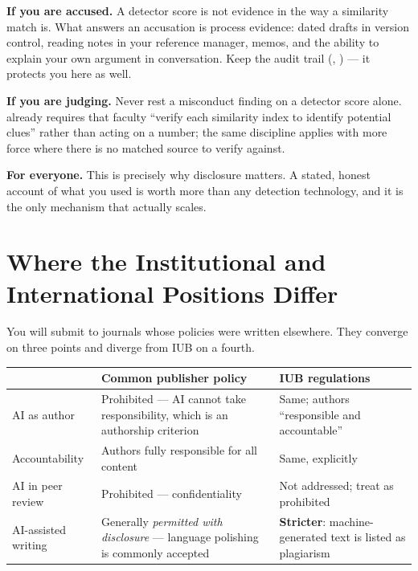 \begin{conceptbox}
\textbf{If you are accused.} A detector score is not evidence in the way a
similarity match is. What answers an accusation is process evidence: dated
drafts in version control, reading notes in your reference manager, memos,
and the ability to explain your own argument in conversation. Keep the audit
trail (, ) --- it protects you here as well.

\medskip
\textbf{If you are judging.} Never rest a misconduct finding on a detector
score alone.  already requires that faculty
``verify each similarity index to identify potential clues'' rather than acting
on a number; the same discipline applies with more force where there is no
matched source to verify against.

\medskip
\textbf{For everyone.} This is precisely why disclosure matters. A stated,
honest account of what you used is worth more than any detection technology,
and it is the only mechanism that actually scales.
\end{conceptbox}

\section{Where the Institutional and International Positions Differ}

You will submit to journals whose policies were written elsewhere. They
converge on three points and diverge from IUB on a fourth.

\begin{center}
\small
\begin{tabular}{@{}L{4.4cm}L{4.6cm}L{4.7cm}@{}}
\toprule
 & \textbf{Common publisher policy} & \textbf{IUB regulations} \\
\midrule
AI as author
  & Prohibited --- AI cannot take responsibility, which is an authorship
    criterion~\cite{icmje2024recommendations}
  & Same; authors ``responsible and accountable'' \\
Accountability
  & Authors fully responsible for all content
  & Same, explicitly \\
AI in peer review
  & Prohibited --- confidentiality
  & Not addressed; treat as prohibited \\
AI-assisted writing
  & Generally \emph{permitted with disclosure} --- language polishing is
    commonly accepted
  & \textbf{Stricter}: machine-generated text is listed as plagiarism \\
\bottomrule
\end{tabular}
\end{center}

